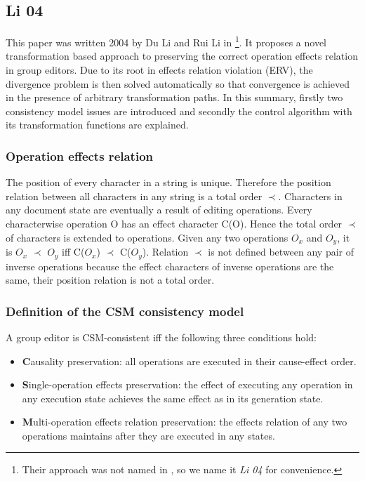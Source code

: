 \subsection{Li 04}
\label{algo:li04}

This paper was written 2004 by Du Li and Rui Li in \cite{li04} \footnote{Their approach was not named in \cite{li04}, so we name it \emph{Li 04} for convenience.}. It proposes a novel transformation based approach to preserving the correct operation effects relation in group editors. Due to its root in effects relation violation (ERV), the divergence problem is then solved automatically so that convergence is achieved in the presence of arbitrary transformation paths.
In this summary, firstly two consistency model issues are introduced and secondly the control algorithm with its transformation functions are explained.

\subsubsection{Operation effects relation}
The position of every character in a string is unique. Therefore the position relation between all characters in any string is a total order $\prec$. Characters in any document state are eventually a result of editing operations. Every characterwise operation O has an effect character C(O). Hence the total order $\prec$ of characters is extended to operations. Given any two operations $O_{x}$ and $O_{y}$, it is $O_{x}$ $\prec$ $O_{y}$ iff C($O_{x}$) $\prec$ C($O_{y}$). Relation $\prec$ is not defined between any pair of inverse operations because the effect characters of inverse operations are the same, their position relation is not a total order.

\subsubsection{Definition of the CSM consistency model}
A group editor is CSM-consistent iff the following three conditions hold:
\begin{itemize}
 \item \textbf{C}ausality preservation: all operations are executed in their cause-effect order.
 \item \textbf{S}ingle-operation effects preservation: the effect of executing any operation in any execution state achieves the same effect as in its generation state.
 \item \textbf{M}ulti-operation effects relation preservation: the effects relation of any two operations maintains after they are executed in any states.
\end{itemize}

